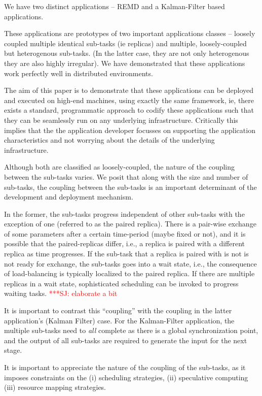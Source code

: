 \documentclass[conference,final]{IEEEtran}
\newcommand{\jhanote}[1]{ {\textcolor{red} { ***SJ: #1 }}}
\newcommand{\jhanote}[1]{}
\begin{document}
We have two distinct applications -- REMD and a Kalman-Filter based
applications.

These applications are prototypes of two important applications
classes -- loosely coupled multiple identical sub-tasks (ie replicas)
and multiple, loosely-coupled but heterogenous sub-tasks.  (In the
latter case, they are not only heterogenous they are also highly
irregular).  We have demonstrated that these applications work
perfectly well in distributed environments.

The aim of this paper is to demonstrate that these applications can be
deployed and executed on high-end machines, using exactly the same
framework, ie, there exists a standard, programmatic approach to
codify these applications such that they can be seamlessly run on any
underlying infrastructure. Critically this implies that the the
application developer focusses on supporting the application
characteristics and not worrying about the details of the underlying
infrastructure.

Although both are classified as loosely-coupled, the nature of the
coupling between the sub-tasks varies. We posit that along with the
size and number of sub-tasks, the coupling between the sub-tasks is an
important determinant of the development and deployment mechanism.



In the former, the sub-tasks
progress independent of other sub-tasks with the exception of one
(referred to as the paired replica). There is a pair-wise exchange of
some parameters after a certain time-period (maybe fixed or not), and
it is possible that the paired-replicas differ, i.e., a replica is
paired with a different replica as time progresses. If the sub-task
that a replica is paired with is not is not ready for exchange, the
sub-tasks goes into a wait state, i.e., the consequence of
load-balancing is typically localized to the paired replica. If there
are multiple replicas in a wait state, sophisticated scheduling can be
invoked to progress waiting tasks. \jhanote{elaborate a bit}

It is important to contrast this ``coupling'' with the coupling in the
latter application's (Kalman Filter) case. For the Kalman-Filter
application, the multiple sub-tasks need to {\it all} complete
as there is a global synchronization point, and the output
of all sub-tasks are required to generate the input for the next
stage.

It is important to appreciate the nature of the coupling of
the sub-tasks, as it imposes constraints on the 
(i) scheduling strategies, (ii) speculative computing (iii) resource
mapping strategies.
\end{document}
